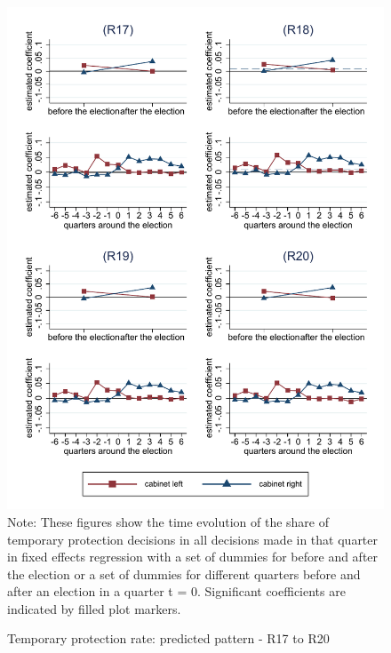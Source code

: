 \documentclass[11pt,a4paper]{scrartcl}
\begin{document}
\clearpage
\FloatBarrier
\begin{figure}[!ht]
	\caption{Temporary protection rate: predicted pattern - R17 to R20}
	\includegraphics[width=1\textwidth]{../results/decisions/temporary_protection_rate_graphs_R17-R20.pdf}
	\scriptsize{Note: These figures show the time evolution of the share of temporary protection decisions in all decisions made in that quarter in fixed effects regression with a set of dummies for before and after the election or a set of dummies for different quarters before and after an election in a quarter t = 0. Significant coefficients are indicated by filled plot markers.}
\end{figure}


\end{document}
